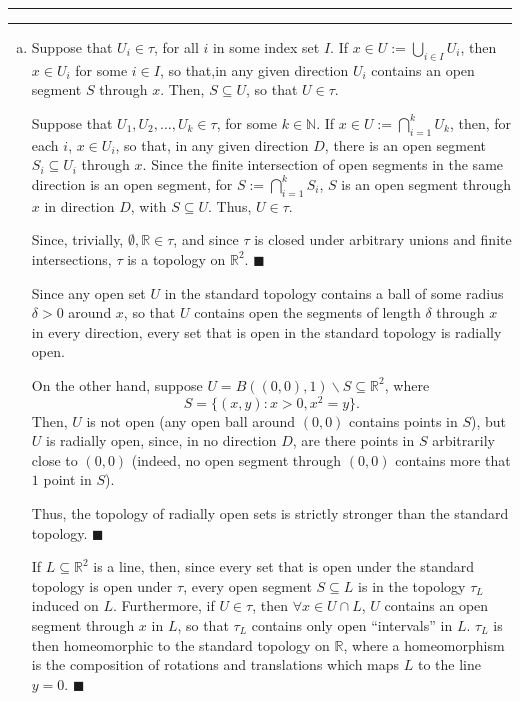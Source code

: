 \documentclass[11pt]{article}
\newcounter{questionCounter}
\newcounter{partCounter}[questionCounter]
\newenvironment{question}[2][\arabic{questionCounter}]{%
    \setcounter{partCounter}{0}%
    \vspace{.25in} \hrule \vspace{0.5em}%
        \noindent{\bf #2}%
    \vspace{0.8em} \hrule \vspace{.10in}%
    \addtocounter{questionCounter}{1}%
}{}
\renewcommand{\qed}{\quad $\blacksquare$}
\newcommand{\sminus}{\backslash}
\newcommand{\R}{\mathbb{R}} %
\begin{document}
\begin{question}{Problem 2}
\begin{enumerate}[(a)]
\item Suppose that $U_i \in \tau$, for all $i$ in some index set $I$. If
$x \in U := \bigcup_{i \in I} U_i$, then $x \in U_i$ for some $i \in I$, so
that,in any given direction $U_i$ contains an open segment $S$ through $x$.
Then, $S \subseteq U$, so that $U \in \tau$.

Suppose that $U_1,U_2,\ldots,U_k \in \tau$, for some $k \in \mathbb{N}$. If
$x \in U := \bigcap_{i = 1}^k U_k$, then, for each $i$, $x \in U_i$, so that,
in any given direction $D$, there is an open segment $S_i \subseteq U_i$
through $x$. Since the finite intersection of open segments in the same
direction is an open segment, for $S := \bigcap_{i = 1}^k S_i$, $S$ is an open
segment through $x$ in direction $D$, with $S \subseteq U$. Thus,
$U \in \tau$.

Since, trivially, $\emptyset,\mathbb{R} \in \tau$, and since $\tau$ is closed
under arbitrary unions and finite intersections, $\tau$ is a topology on
$\mathbb{R}^2$. \qed

Since any open set $U$ in the standard topology contains a ball of some radius
$\delta > 0$ around $x$, so that $U$ contains open the segments of length
$\delta$ through $x$ in every direction, every set that is open in the
standard topology is radially open.

On the other hand, suppose $U = B((0,0),1) \sminus S \subseteq \R^2$, where
\[S = \{(x,y) : x > 0, x^2 = y\}.\]
Then, $U$ is not open (any open ball around $(0,0)$ contains points in $S$),
but $U$ is radially open, since, in no direction $D$, are there points in $S$
arbitrarily close to $(0,0)$ (indeed, no open segment through $(0,0)$
contains more that $1$ point in $S$).

Thus, the topology of radially open sets is strictly stronger than the
standard topology. \qed

If $L \subseteq \R^2$ is a line, then, since every set that is open under the
standard topology is open under $\tau$, every open segment $S \subseteq L$ is
in the topology $\tau_L$ induced on $L$. Furthermore, if $U \in \tau$, then
$\forall x \in U \cap L$, $U$ contains an open segment through $x$ in $L$, so
that $\tau_L$ contains only open ``intervals'' in $L$. $\tau_L$ is then
homeomorphic to the standard topology on $\mathbb{R}$, where a homeomorphism
is the composition of rotations and translations which maps $L$ to the line
$y = 0$. \qed


\end{enumerate}
\end{question}
\end{document}
